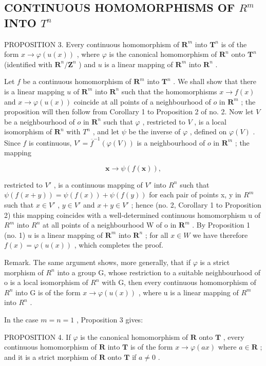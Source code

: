 \subsection{\texorpdfstring{CONTINUOUS HOMOMORPHISMS OF \(R^{m}\) INTO \(T^{n}\)}{CONTINUOUS HOMOMORPHISMS OF R TO THE M INTO T TO THE N}}

PROPOSITION 3. Every continuous homomorphism of \(\mathbf{R}^m\) into \(\mathbf{T}^n\) is of the form \(x \to \varphi(u(x))\) , where \(\varphi\) is the canonical homomorphism of \(\mathbf{R}^n\) onto \(\mathbf{T}^n\) (identified with \(\mathbf{R}^n / \mathbf{Z}^n\) ) and \(u\) is a linear mapping of \(\mathbf{R}^m\) into \(\mathbf{R}^n\) .

Let \(f\) be a continuous homomorphism of \(\mathbf{R}^m\) into \(\mathbf{T}^n\) . We shall show that there is a linear mapping \(u\) of \(\mathbf{R}^m\) into \(\mathbf{R}^n\) such that the homomorphisms \(x \to f(x)\) and \(x \to \varphi(u(x))\) coincide at all points of a neighbourhood of \(o\) in \(\mathbf{R}^m\) ; the proposition will then follow from Corollary 1 to Proposition 2 of no. 2. Now let \(V\) be a neighbourhood of \(o\) in \(\mathbf{R}^n\) such that \(\varphi\) , restricted to \(V\) , is a local isomorphism of \(\mathbf{R}^n\) with \(T^n\) , and let \(\psi\) be the inverse of \(\varphi\) , defined on \(\varphi(V)\) . Since \(f\) is continuous, \(V' = \overline{f}^{-1}(\varphi(V))\) is a neighbourhood of \(o\) in \(\mathbf{R}^m\) ; the mapping

\[
\boldsymbol {x} \rightarrow \psi (f (\boldsymbol {x})),
\]

restricted to \(V'\) , is a continuous mapping of \(V'\) into \(R^n\) such that \(\psi(f(x+y)) = \psi(f(x)) + \psi(f(y))\) for each pair of points x, y in \(R^m\) such that \(x \in V'\) , \(y \in V'\) and \(x + y \in V'\) ; hence (no. 2, Corollary 1 to Proposition 2) this mapping coincides with a well-determined continuous homomorphism u of \(R^m\) into \(R^n\) at all points of a neighbourhood W of o in \(\mathbf{R}^m\) . By Proposition 1 (no. 1) \(u\) is a linear mapping of \(\mathbf{R}^m\) into \(\mathbf{R}^n\) ; for all \(x \in W\) we have therefore \(f(x) = \varphi(u(x))\) , which completes the proof.

Remark. The same argument shows, more generally, that if \(\varphi\) is a strict morphism of \(R^{n}\) into a group G, whose restriction to a suitable neighbourhood of o is a local isomorphism of \(R^{n}\) with G, then every continuous homomorphism of \(R^{n}\) into G is of the form \(x \to \varphi(u(x))\) , where u is a linear mapping of \(R^{m}\) into \(R^{n}\) .

In the case \(m = n = 1\) , Proposition 3 gives:

PROPOSITION 4. If \(\varphi\) is the canonical homomorphism of \(\mathbf{R}\) onto \(\mathbf{T}\) , every continuous homomorphism of \(\mathbf{R}\) into \(\mathbf{T}\) is of the form \(x \to \varphi(ax)\) where \(a \in \mathbf{R}\) ; and it is a strict morphism of \(\mathbf{R}\) onto \(\mathbf{T}\) if \(a \neq 0\) .

